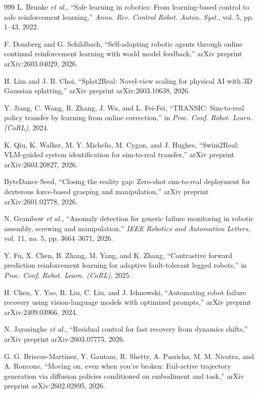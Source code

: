 \documentclass[12pt,a4paper,oneside]{report}
\begin{document}
\begin{thebibliography}{999}
L. Brunke \textit{et al.}, ``Safe learning in robotics: From learning-based control to safe reinforcement learning,'' \textit{Annu. Rev. Control Robot. Auton. Syst.}, vol. 5, pp. 1--43, 2022.

F. Domberg and G. Schildbach, ``Self-adapting robotic agents through online continual reinforcement learning with world model feedback,'' arXiv preprint arXiv:2603.04029, 2026.

H. Lim and J. B. Choi, ``Splat2Real: Novel-view scaling for physical {AI} with {3D} Gaussian splatting,'' arXiv preprint arXiv:2603.10638, 2026.

Y. Jiang, C. Wang, R. Zhang, J. Wu, and L. Fei-Fei, ``{TRANSIC}: Sim-to-real policy transfer by learning from online correction,'' in \textit{Proc. Conf. Robot. Learn. (CoRL)}, 2024.

K. Qiu, K. Walker, M. Y. Michelis, M. Cygan, and J. Hughes, ``Swim2Real: VLM-guided system identification for sim-to-real transfer,'' arXiv preprint arXiv:2603.20827, 2026.

ByteDance Seed, ``Closing the reality gap: Zero-shot sim-to-real deployment for dexterous force-based grasping and manipulation,'' arXiv preprint arXiv:2601.02778, 2026.

N. Grambow \textit{et al.}, ``Anomaly detection for generic failure monitoring in robotic assembly, screwing and manipulation,'' \textit{IEEE Robotics and Automation Letters}, vol. 11, no. 5, pp. 3664--3671, 2026.

Y. Fu, X. Chen, B. Zhang, M. Yang, and K. Zhang, ``Contrastive forward prediction reinforcement learning for adaptive fault-tolerant legged robots,'' in \textit{Proc. Conf. Robot. Learn. (CoRL)}, 2025.

H. Chen, Y. Yao, R. Liu, C. Liu, and J. Ichnowski, ``Automating robot failure recovery using vision-language models with optimized prompts,'' arXiv preprint arXiv:2409.03966, 2024.

N. Jayasinghe \textit{et al.}, ``Residual control for fast recovery from dynamics shifts,'' arXiv preprint arXiv:2603.07775, 2026.

G. G. Briscoe-Martinez, Y. Gautam, R. Shetty, A. Pasricha, M. M. Nicotra, and A. Roncone, ``Moving on, even when you're broken: Fail-active trajectory generation via diffusion policies conditioned on embodiment and task,'' arXiv preprint arXiv:2602.02895, 2026.


\end{thebibliography}
\end{document}
